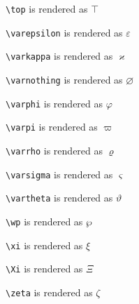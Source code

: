 \texttt{\textbackslash top} is rendered as $\top$


\texttt{\textbackslash varepsilon} is rendered as $\varepsilon$


\texttt{\textbackslash varkappa} is rendered as $\varkappa$


\texttt{\textbackslash varnothing} is rendered as $\varnothing$


\texttt{\textbackslash varphi} is rendered as $\varphi$


\texttt{\textbackslash varpi} is rendered as $\varpi$


\texttt{\textbackslash varrho} is rendered as $\varrho$


\texttt{\textbackslash varsigma} is rendered as $\varsigma$


\texttt{\textbackslash vartheta} is rendered as $\vartheta$


\texttt{\textbackslash wp} is rendered as $\wp$


\texttt{\textbackslash xi} is rendered as $\xi$


\texttt{\textbackslash Xi} is rendered as $\Xi$


\texttt{\textbackslash zeta} is rendered as $\zeta$

